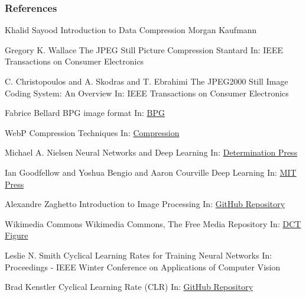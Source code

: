\documentclass{beamer}
\begin{document}
\begin{frame}[allowframebreaks]
\frametitle{References}
\footnotesize{
\begin{thebibliography}{99} %
 Khalid Sayood
\newblock Introduction to Data Compression
\newblock Morgan Kaufmann

 Gregory K. Wallace
\newblock The JPEG Still Picture Compression Stantard
\newblock In: IEEE Transactions on Consumer Electronics

 C. Christopoulos and A. Skodras and T. Ebrahimi
\newblock The JPEG2000 Still Image Coding System: An Overview
\newblock In: IEEE Transactions on Consumer Electronics

 Fabrice Bellard
\newblock BPG image format
\newblock In: \href{https://bellard.org/bpg/}{BPG}

 WebP
\newblock Compression Techniques 
\newblock In: \href{https://developers.google.com/speed/webp/docs/compression}{Compression}

 Michael A. Nielsen
\newblock Neural Networks and Deep Learning
\newblock In: \href{http://neuralnetworksanddeeplearning.com/}{Determination Press}

 Ian Goodfellow and Yoshua Bengio and Aaron Courville
\newblock Deep Learning
\newblock In: \href{http://www.deeplearningbook.org}{MIT Press}

 Alexandre Zaghetto
\newblock Introduction to Image Processing
\newblock In: \href{https://github.com/zaghetto/ImageProcessing}{GitHub Repository}

 Wikimedia Commons
\newblock Wikimedia Commons, The Free Media Repository
\newblock In: \href{https://commons.wikimedia.org/w/index.php?curid=10414002}{DCT Figure}

 Leslie N. Smith
\newblock Cyclical Learning Rates for Training Neural Networks
\newblock In: Proceedings - IEEE Winter Conference on Applications of Computer Vision

 Brad Kenstler
\newblock Cyclical Learning Rate (CLR)
\newblock In: \href{https://github.com/bckenstler/CLR/}{GitHub Repository}


\end{thebibliography}}
\end{frame}
\end{document}
